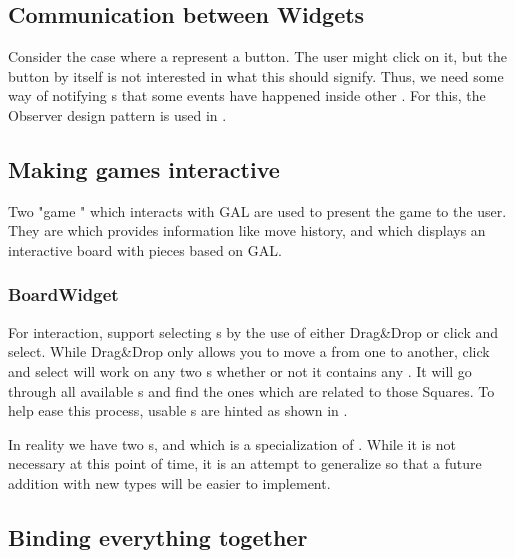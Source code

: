\subsection{Communication between Widgets}

Consider the case where a  represent a button. The user might click on it, but the button by itself is not interested in what this should signify. Thus, we need some way of notifying s that some events have happened inside other . For this, the Observer design pattern is used in .


\subsection{Making games interactive}

Two "game " which interacts with GAL are used to present the game to the user. They are  which provides information like move history, and  which displays an interactive board with pieces based on GAL.

\subsubsection{BoardWidget}

For interaction,  support selecting s by the use of either Drag\&Drop or click and select. While Drag\&Drop only allows you to move a  from one  to another, click and select will work on any two s whether or not it contains any . It will go through all available s and find the ones which are related to those Squares. To help ease this process, usable s are hinted as shown in .

In reality we have two s,  and  which is a specialization of . While it is not necessary at this point of time, it is an attempt to generalize  so that a future addition with new  types will be easier to implement.


\subsection{Binding everything together}

